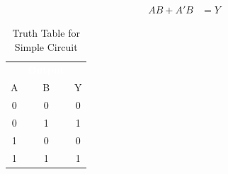 \begin{align}
  \label{KM:eq:simple_circuit_for_karnaugh_map}
  AB+A'B &= Y
\end{align}

\begin{table}[H]
  \sffamily
  \newcommand{\head}[1]{\textcolor{white}{\textbf{#1}}}    
  \begin{center}
    \begin{tabular}{ccc} 
      \rowcolor{black!75}
      \multicolumn{2}{c}{\head{Inputs}} & \head{Output} \\
      A & B & Y \\
      \hline
      0 & 0 & 0 \\
      0 & 1 & 1 \\
      1 & 0 & 0 \\
      1 & 1 & 1 
    \end{tabular}
  \end{center}
  \caption{Truth Table for Simple Circuit}
  \label{KM:tab:truth_table_simple_circuit}
\end{table}

